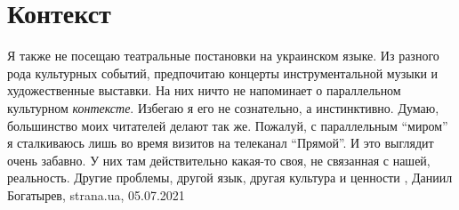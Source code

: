  
 
 
 
 
\chapter{Контекст}
\label{sec:slova.kontekst}

Я также не посещаю театральные постановки на украинском языке. Из разного рода
культурных событий, предпочитаю концерты инструментальной музыки и
художественные выставки. На них ничто не напоминает о параллельном культурном
\emph{контексте}. Избегаю я его не сознательно, а инстинктивно. Думаю, большинство
моих читателей делают так же.  Пожалуй, с параллельным \enquote{миром} я сталкиваюсь
лишь во время визитов на телеканал \enquote{Прямой}. И это выглядит очень забавно. У
них там действительно какая-то своя, не связанная с нашей, реальность. Другие
проблемы, другой язык, другая культура и ценности
, 
Даниил Богатырев, strana.ua, 05.07.2021
